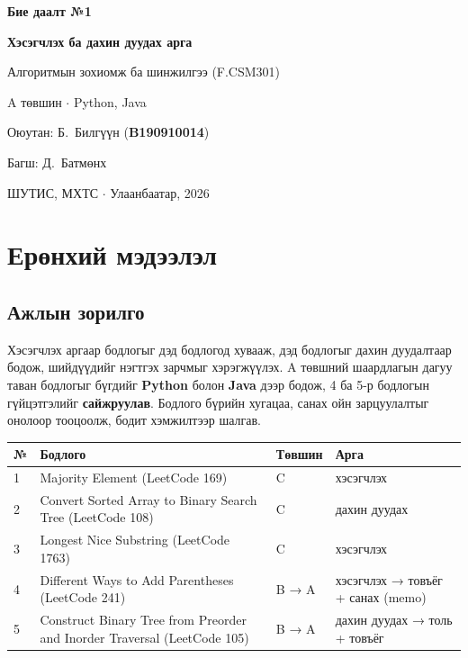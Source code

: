 \documentclass[11pt,a4paper]{article}
\begin{document}
\begin{titlepage}
\centering
\vspace*{35mm}
{\LARGE\bfseries Бие даалт №1\par}
\vspace{4mm}
{\Large\bfseries Хэсэгчлэх ба дахин дуудах арга\par}
\vspace{12mm}
{\large Алгоритмын зохиомж ба шинжилгээ (F.CSM301)\par}
\vspace{6mm}
{\large A төвшин $\cdot$ Python, Java\par}
\vfill
{\large Оюутан: Б.~Билгүүн (\textbf{B190910014})\par}
\vspace{3mm}
{\large Багш: Д.~Батмөнх\par}
\vspace{20mm}
ШУТИС, МХТС $\cdot$ Улаанбаатар, 2026\par
\end{titlepage}

\tableofcontents
\clearpage

\section{Ерөнхий мэдээлэл}

\subsection{Ажлын зорилго}
Хэсэгчлэх аргаар бодлогыг дэд бодлогод хувааж, дэд бодлогыг дахин дуудалтаар бодож, шийдүүдийг нэгтгэх зарчмыг хэрэгжүүлэх. A төвшний шаардлагын дагуу таван бодлогыг бүгдийг \textbf{Python} болон \textbf{Java} дээр бодож, 4 ба 5-р бодлогын гүйцэтгэлийг \textbf{сайжруулав}. Бодлого бүрийн хугацаа, санах ойн зарцуулалтыг онолоор тооцоолж, бодит хэмжилтээр шалгав.

\begin{center}
\small
\begin{tabularx}{\linewidth}{l>{\raggedright\arraybackslash}Xll}
\toprule
\textbf{№} & \textbf{Бодлого} & \textbf{Төвшин} & \textbf{Арга} \\
\midrule
1 & Majority Element (LeetCode 169) & C & хэсэгчлэх \\
2 & Convert Sorted Array to Binary Search Tree (LeetCode 108) & C & дахин дуудах \\
3 & Longest Nice Substring (LeetCode 1763) & C & хэсэгчлэх \\
4 & Different Ways to Add Parentheses (LeetCode 241) & B → A & хэсэгчлэх → товъёг + санах (memo) \\
5 & Construct Binary Tree from Preorder and Inorder Traversal (LeetCode 105) & B → A & дахин дуудах → толь + товъёг \\
\bottomrule
\end{tabularx}
\end{center}
\end{document}
